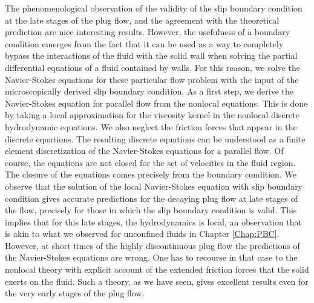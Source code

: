 \documentclass[b5paper,openright,10pt]{book}
\begin{document}
The phenomenological observation of the  validity of the slip boundary
condition at the late stages of  the plug flow, and the agreement with
the theoretical prediction are  nice interesting results. However, the
usefulness of a  boundary condition emerges from the fact  that it can
be used  as a way to  completely bypass the interactions  of the fluid
with the solid wall when solving the partial differential equations of
a  fluid  contained   by  walls.   For  this  reason,   we  solve  the
Navier-Stokes  equations for  these particular  flow problem  with the
input of  the microscopically derived  slip boundary condition.   As a
first step,  we derive  the Navier-Stokes  equation for  parallel flow
from  the  nonlocal  equations.   This  is done  by  taking  a  local
approximation  for  the viscosity  kernel  in  the nonlocal  discrete
hydrodynamic  equations.  We  also  neglect the  friction forces  that
appear in the discrete equations. The resulting discrete equations can
be understood as a finite  element discretization of the Navier-Stokes
equations for a parallel flow. Of course, the equations are not closed
for the  set of velocities  in the fluid  region.  The closure  of the
equations comes precisely from the boundary condition. We observe that
the solution  of the local  Navier-Stokes equation with  slip boundary
condition gives  accurate predictions  for the  decaying plug  flow at
late  stages of  the  flow,  precisely for  those  in  which the  slip
boundary condition is  valid. This implies that for  this late stages,
the hydrodynamics  is local, an  observation that  is akin to  what we
observed for unconfined fluids in Chapter \ref{Chap:PBC}. However, at short times of
the   highly  discontinuous   plug   flow  the   predictions  of   the
Navier-Stokes equations are wrong. One has to recourse in that case to
the nonlocal  theory with explicit  account of the  extended friction
forces that the solid  exerts on the fluid. Such a  theory, as we have
seen, gives  excellent results even for  the very early stages  of the
plug flow.
\end{document}
